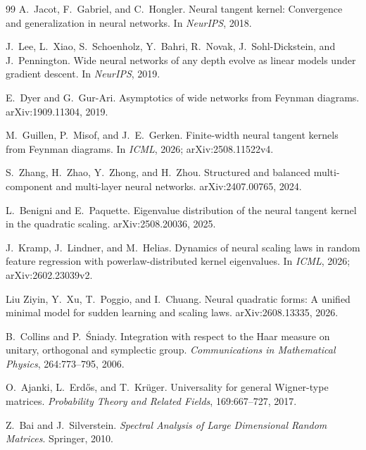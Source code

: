 \documentclass{article}
\begin{document}
\begin{thebibliography}{99}
A.~Jacot, F.~Gabriel, and C.~Hongler.
\newblock Neural tangent kernel: Convergence and generalization in neural networks.
\newblock In \emph{NeurIPS}, 2018.

J.~Lee, L.~Xiao, S.~Schoenholz, Y.~Bahri, R.~Novak, J.~Sohl-Dickstein, and J.~Pennington.
\newblock Wide neural networks of any depth evolve as linear models under gradient descent.
\newblock In \emph{NeurIPS}, 2019.

E.~Dyer and G.~Gur-Ari.
\newblock Asymptotics of wide networks from Feynman diagrams.
\newblock arXiv:1909.11304, 2019.

M.~Guillen, P.~Misof, and J.~E.~Gerken.
\newblock Finite-width neural tangent kernels from Feynman diagrams.
\newblock In \emph{ICML}, 2026; arXiv:2508.11522v4.

S.~Zhang, H.~Zhao, Y.~Zhong, and H.~Zhou.
\newblock Structured and balanced multi-component and multi-layer neural networks.
\newblock arXiv:2407.00765, 2024.

L.~Benigni and E.~Paquette.
\newblock Eigenvalue distribution of the neural tangent kernel in the quadratic scaling.
\newblock arXiv:2508.20036, 2025.

J.~Kramp, J.~Lindner, and M.~Helias.
\newblock Dynamics of neural scaling laws in random feature regression with powerlaw-distributed kernel eigenvalues.
\newblock In \emph{ICML}, 2026; arXiv:2602.23039v2.

Liu Ziyin, Y.~Xu, T.~Poggio, and I.~Chuang.
\newblock Neural quadratic forms: A unified minimal model for sudden learning
and scaling laws.
\newblock arXiv:2608.13335, 2026.

B.~Collins and P.~{\'S}niady.
\newblock Integration with respect to the Haar measure on unitary, orthogonal and symplectic group.
\newblock \emph{Communications in Mathematical Physics}, 264:773--795, 2006.

O.~Ajanki, L.~Erd\H{o}s, and T.~Kr\"uger.
\newblock Universality for general Wigner-type matrices.
\newblock \emph{Probability Theory and Related Fields}, 169:667--727, 2017.

Z.~Bai and J.~Silverstein.
\newblock \emph{Spectral Analysis of Large Dimensional Random Matrices}.
\newblock Springer, 2010.
\end{thebibliography}
\end{document}
